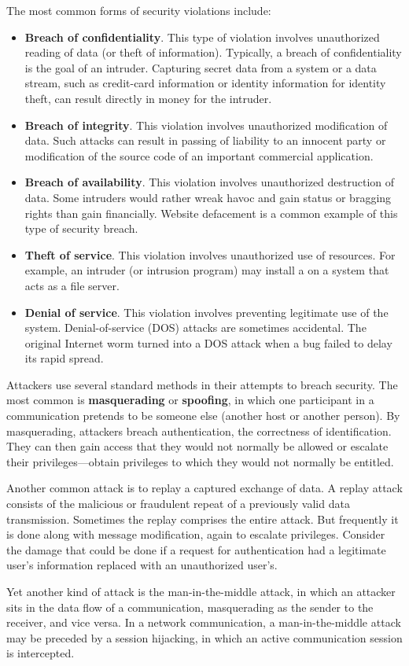 The most common forms of security violations include:
\begin{itemize}[noitemsep]
\item \textbf{Breach of confidentiality}.
  This type of violation involves unauthorized reading of data (or theft of information).
  Typically, a breach of confidentiality is the goal of an intruder.
  Capturing secret data from a system or a data stream, such as credit-card information or identity information for identity theft, can result directly in money for the intruder.
\item \textbf{Breach of integrity}.
  This violation involves unauthorized modification of data.
  Such attacks can result in passing of liability to an innocent party or modification of the source code of an important commercial application.
\item \textbf{Breach of availability}.
  This violation involves unauthorized destruction of data.
  Some intruders would rather wreak havoc and gain status or bragging rights than gain financially.
  Website defacement is a common example of this type of security breach.
\item \textbf{Theft of service}.
  This violation involves unauthorized use of resources.
  For example, an intruder (or intrusion program) may install a  on a system that acts as a file server.
\item \textbf{Denial of service}.
  This violation involves preventing legitimate use of the system.
  Denial-of-service (DOS) attacks are sometimes accidental.
  The original Internet worm turned into a DOS attack when a bug failed to delay its rapid spread.
\end{itemize}

Attackers use several standard methods in their attempts to breach security.
The most common is \textbf{masquerading} or \textbf{spoofing}, in which one participant in a communication pretends to be someone else (another host or another person).
By masquerading, attackers breach authentication, the correctness of identification.
They can then gain access that they would not normally be allowed or escalate their privileges—obtain privileges to which they would not normally be entitled.

Another common attack is to replay a captured exchange of data.
A replay attack consists of the malicious or fraudulent repeat of a previously valid data transmission.
Sometimes the replay comprises the entire attack.
But frequently it is done along with message modification, again to escalate privileges.
Consider the damage that could be done if a request for authentication had a legitimate user’s information replaced with an unauthorized user’s.

Yet another kind of attack is the man-in-the-middle attack, in which an attacker sits in the data flow of a communication, masquerading as the sender to the receiver, and vice versa.
In a network communication, a man-in-the-middle attack may be preceded by a session hijacking, in which an active communication session is intercepted.

